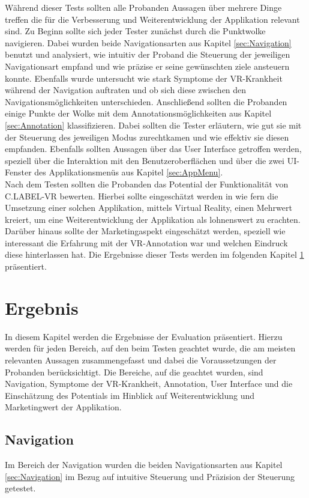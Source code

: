 Während dieser Tests sollten alle Probanden Aussagen über mehrere Dinge treffen die für die Verbesserung und Weiterentwicklung der Applikation relevant sind. Zu Beginn sollte sich jeder Tester zunächst durch die Punktwolke navigieren. Dabei wurden beide Navigationsarten aus Kapitel \ref{sec:Navigation} benutzt und analysiert, wie intuitiv der Proband die Steuerung der jeweiligen Navigationsart empfand und wie präzise er seine gewünschten ziele ansteuern konnte. Ebenfalls wurde untersucht wie stark Symptome der VR-Krankheit während der Navigation auftraten und ob sich diese zwischen den Navigationsmöglichkeiten unterschieden. Anschließend sollten die Probanden einige Punkte der Wolke mit dem Annotationsmöglichkeiten aus Kapitel \ref{sec:Annotation} klassifizieren. Dabei sollten die Tester erläutern, wie gut sie mit der Steuerung des jeweiligen Modus zurechtkamen und wie effektiv sie diesen empfanden. Ebenfalls sollten Aussagen über das User Interface getroffen werden, speziell über die Interaktion mit den Benutzeroberflächen und über die zwei UI-Fenster des Applikationsmenüs aus Kapitel \ref{sec:AppMenu}.\\

Nach dem Testen sollten die Probanden das Potential der Funktionalität von C.LABEL-VR bewerten. Hierbei sollte eingeschätzt werden in wie fern die Umsetzung einer solchen Applikation, mittels Virtual Reality, einen Mehrwert kreiert, um eine Weiterentwicklung der Applikation als lohnenswert zu erachten. Darüber hinaus sollte der Marketingaspekt eingeschätzt werden, speziell wie interessant die Erfahrung mit der VR-Annotation war und welchen Eindruck diese hinterlassen hat. Die Ergebnisse dieser Tests werden im folgenden Kapitel \ref{sec:EvaluationErgebnis} präsentiert.


\section{Ergebnis}
\label{sec:EvaluationErgebnis}
In diesem Kapitel werden die Ergebnisse der Evaluation präsentiert. Hierzu werden für jeden Bereich, auf den beim Testen geachtet wurde, die am meisten relevanten Aussagen zusammengefasst und dabei die Voraussetzungen der Probanden berücksichtigt. Die Bereiche, auf die geachtet wurden, sind Navigation, Symptome der VR-Krankheit, Annotation, User Interface und die Einschätzung des Potentials im Hinblick auf Weiterentwicklung und Marketingwert der Applikation. 

\subsection{Navigation}
Im Bereich der Navigation wurden die beiden Navigationsarten aus Kapitel \ref{sec:Navigation} im Bezug auf intuitive Steuerung und Präzision der Steuerung getestet.

